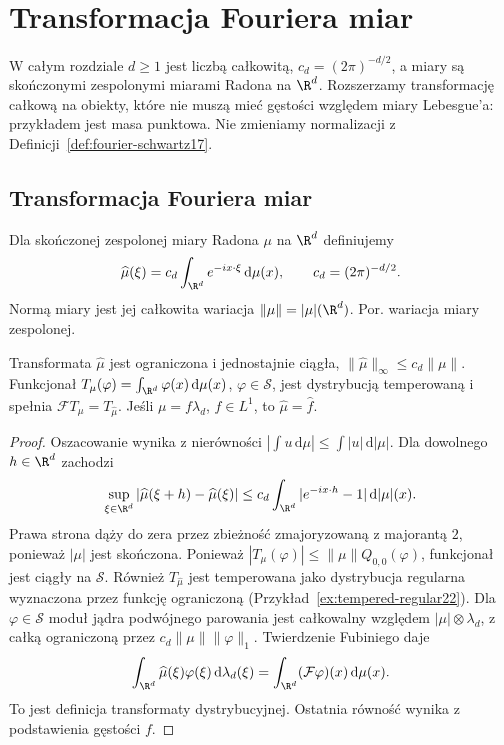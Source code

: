 \section{Transformacja Fouriera miar}
\providecommand{\atlasref}[2]{#2}

W całym rozdziale $d\ge1$ jest liczbą całkowitą,
$c_d=(2\pi)^{-d/2}$, a miary są skończonymi zespolonymi
miarami Radona na $\R^d$. Rozszerzamy transformację
całkową na obiekty, które nie muszą mieć gęstości
względem miary Lebesgue'a: przykładem jest masa punktowa.
Nie zmieniamy normalizacji z Definicji~\ref{def:fourier-schwartz17}.

\subsection{Transformacja Fouriera miar}

\begin{definicja}
\label{def:dt-fourier-measure}
Dla skończonej zespolonej miary Radona $\mu$ na $\R^d$
definiujemy
\[
 \widehat\mu(\xi)=c_d\int_{\R^d}e^{-ix\cdot\xi}
 \,\mathrm d\mu(x),\qquad c_d=(2\pi)^{-d/2}.
\]
Normą miary jest jej całkowita wariacja
$\|\mu\|=|\mu|(\R^d)$.
Por. \atlasref{ME-16::thm:complex-variation-16}{wariacja miary zespolonej}.
\end{definicja}

\begin{twierdzenie}
\label{thm:dt-fourier-measure-cont}
Transformata $\widehat\mu$ jest ograniczona i jednostajnie
ciągła, $\|\widehat\mu\|_\infty\le c_d\|\mu\|$.
Funkcjonał
$T_\mu(\varphi)=\int_{\R^d}\varphi(x)\,\mathrm d\mu(x)$,
$\varphi\in\mathcal S$, jest dystrybucją temperowaną i spełnia $\mathcal FT_\mu=T_{\widehat\mu}$.
Jeśli $\mu=f\lambda_d$, $f\in L^1$, to $\widehat\mu=\widehat f$.
\end{twierdzenie}
\begin{proof}
Oszacowanie wynika z nierówności
$|\int u\,\mathrm d\mu|\le\int|u|\,\mathrm d|\mu|$.
Dla dowolnego $h\in\R^d$ zachodzi
\[
 \sup_{\xi\in\R^d}|\widehat\mu(\xi+h)-\widehat\mu(\xi)|
 \le c_d\int_{\R^d}|e^{-ix\cdot h}-1|\,\mathrm d|\mu|(x).
\]
Prawa strona dąży do zera przez zbieżność zmajoryzowaną
z majorantą $2$, ponieważ $|\mu|$ jest skończona.
Ponieważ $|T_\mu(\varphi)|\le\|\mu\|Q_{0,0}(\varphi)$,
funkcjonał jest ciągły na $\mathcal S$. Również
$T_{\widehat\mu}$ jest temperowana jako dystrybucja
regularna wyznaczona przez funkcję ograniczoną
(Przykład~\ref{ex:tempered-regular22}).
Dla $\varphi\in\mathcal S$ moduł jądra podwójnego
parowania jest całkowalny względem
$|\mu|\otimes\lambda_d$, z całką ograniczoną przez
$c_d\|\mu\|\|\varphi\|_1$. Twierdzenie Fubiniego daje
\[
 \int_{\R^d}\widehat\mu(\xi)\varphi(\xi)\,\mathrm d\lambda_d(\xi)
 =\int_{\R^d}(\mathcal F\varphi)(x)\,\mathrm d\mu(x).
\]
To jest definicja transformaty dystrybucyjnej.
Ostatnia równość wynika z podstawienia gęstości $f$.
\end{proof}


